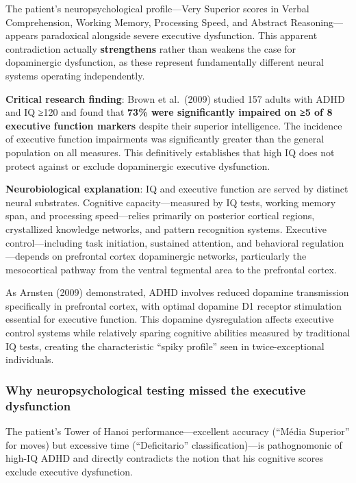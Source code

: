 The patient's neuropsychological profile---Very Superior scores in Verbal Comprehension, Working Memory, Processing Speed, and Abstract Reasoning---appears paradoxical alongside severe executive dysfunction. This apparent contradiction actually \textbf{strengthens} rather than weakens the case for dopaminergic dysfunction, as these represent fundamentally different neural systems operating independently.

\textbf{Critical research finding}: Brown et al.~(2009) studied 157 adults with ADHD and IQ ≥120 and found that \textbf{73\% were significantly impaired on ≥5 of 8 executive function markers} despite their superior intelligence. The incidence of executive function impairments was significantly greater than the general population on all measures. This definitively establishes that high IQ does not protect against or exclude dopaminergic executive dysfunction.

\textbf{Neurobiological explanation}: IQ and executive function are served by distinct neural substrates. Cognitive capacity---measured by IQ tests, working memory span, and processing speed---relies primarily on posterior cortical regions, crystallized knowledge networks, and pattern recognition systems. Executive control---including task initiation, sustained attention, and behavioral regulation---depends on prefrontal cortex dopaminergic networks, particularly the mesocortical pathway from the ventral tegmental area to the prefrontal cortex.

As Arnsten (2009) demonstrated, ADHD involves reduced dopamine transmission specifically in prefrontal cortex, with optimal dopamine D1 receptor stimulation essential for executive function. This dopamine dysregulation affects executive control systems while relatively sparing cognitive abilities measured by traditional IQ tests, creating the characteristic ``spiky profile'' seen in twice-exceptional individuals.

\subsubsection{Why neuropsychological testing missed the executive dysfunction}\label{10a_trd_basis-why-neuropsychological-testing-missed-the-executive-dysfunction}

The patient's Tower of Hanoi performance---excellent accuracy (``Média Superior'' for moves) but excessive time (``Deficitario'' classification)---is pathognomonic of high-IQ ADHD and directly contradicts the notion that his cognitive scores exclude executive dysfunction.

